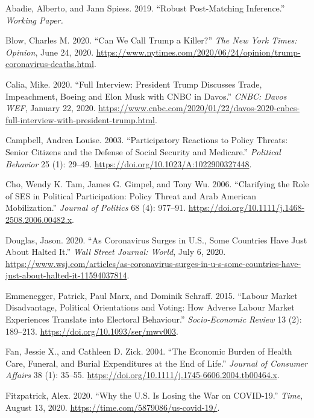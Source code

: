 \documentclass[
  12pt,
]{article}
\newlength{\cslhangindent}
\newenvironment{cslreferences}%
  {\setlength{\parindent}{0pt}%
  \everypar{\setlength{\hangindent}{\cslhangindent}}\ignorespaces}%
  {\par}
\begin{document}
\hypertarget{refs}{}
\begin{cslreferences}
\leavevmode\hypertarget{ref-Abadie2019}{}%
Abadie, Alberto, and Jann Spiess. 2019. ``Robust Post-Matching Inference.'' \emph{Working Paper.}

\leavevmode\hypertarget{ref-Blow2020}{}%
Blow, Charles M. 2020. ``Can We Call Trump a Killer?'' \emph{The New York Times: Opinion}, June 24, 2020. \url{https://www.nytimes.com/2020/06/24/opinion/trump-coronavirus-deaths.html}.

\leavevmode\hypertarget{ref-Calia2020}{}%
Calia, Mike. 2020. ``Full Interview: President Trump Discusses Trade, Impeachment, Boeing and Elon Musk with CNBC in Davos.'' \emph{CNBC: Davos WEF}, January 22, 2020. \url{https://www.cnbc.com/2020/01/22/davos-2020-cnbcs-full-interview-with-president-trump.html}.

\leavevmode\hypertarget{ref-Campbell2003}{}%
Campbell, Andrea Louise. 2003. ``Participatory Reactions to Policy Threats: Senior Citizens and the Defense of Social Security and Medicare.'' \emph{Political Behavior} 25 (1): 29--49. \url{https://doi.org/10.1023/A:1022900327448}.

\leavevmode\hypertarget{ref-Cho2006a}{}%
Cho, Wendy K. Tam, James G. Gimpel, and Tony Wu. 2006. ``Clarifying the Role of SES in Political Participation: Policy Threat and Arab American Mobilization.'' \emph{Journal of Politics} 68 (4): 977--91. \url{https://doi.org/10.1111/j.1468-2508.2006.00482.x}.

\leavevmode\hypertarget{ref-Douglas2020}{}%
Douglas, Jason. 2020. ``As Coronavirus Surges in U.S., Some Countries Have Just About Halted It.'' \emph{Wall Street Journal: World}, July 6, 2020. \url{https://www.wsj.com/articles/as-coronavirus-surges-in-u-s-some-countries-have-just-about-halted-it-11594037814}.

\leavevmode\hypertarget{ref-Emmenegger2015}{}%
Emmenegger, Patrick, Paul Marx, and Dominik Schraff. 2015. ``Labour Market Disadvantage, Political Orientations and Voting: How Adverse Labour Market Experiences Translate into Electoral Behaviour.'' \emph{Socio-Economic Review} 13 (2): 189--213. \url{https://doi.org/10.1093/ser/mwv003}.

\leavevmode\hypertarget{ref-Fan2004}{}%
Fan, Jessie X., and Cathleen D. Zick. 2004. ``The Economic Burden of Health Care, Funeral, and Burial Expenditures at the End of Life.'' \emph{Journal of Consumer Affairs} 38 (1): 35--55. \url{https://doi.org/10.1111/j.1745-6606.2004.tb00464.x}.

\leavevmode\hypertarget{ref-Fitzpatrick2020}{}%
Fitzpatrick, Alex. 2020. ``Why the U.S. Is Losing the War on COVID-19.'' \emph{Time}, August 13, 2020. \url{https://time.com/5879086/us-covid-19/}.


\end{cslreferences}
\end{document}
